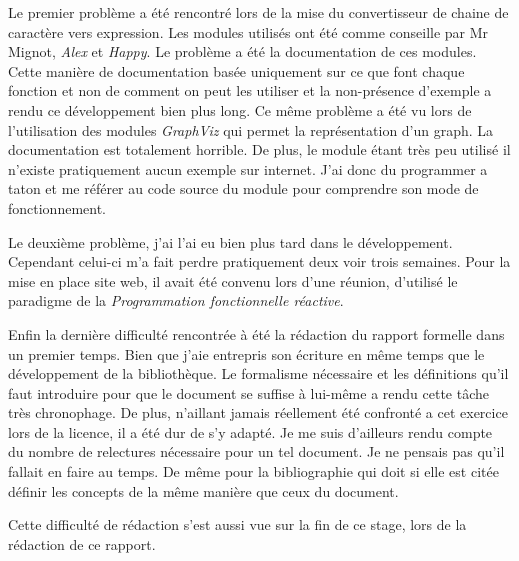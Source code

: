 \vphantom{}

Le premier problème a été rencontré lors de la mise du convertisseur de chaine 
de caractère vers expression. Les modules utilisés ont été comme conseille par 
Mr Mignot, \textit{Alex} et \textit{Happy}. Le problème a été la documentation 
de ces modules. Cette manière de documentation basée uniquement sur ce que font 
chaque fonction et non de comment on peut les utiliser et la non-présence 
d'exemple a rendu ce développement bien plus long. Ce même problème a été vu 
lors de l'utilisation des modules \textit{GraphViz} qui permet la représentation
d'un graph. La documentation est totalement horrible. De plus, le module étant 
très peu utilisé il n'existe pratiquement aucun exemple sur internet. J'ai donc
du programmer a taton et me référer au code source du module pour comprendre 
son mode de fonctionnement.

\vphantom{}

Le deuxième problème, j'ai l'ai eu bien plus tard dans le développement. 
Cependant celui-ci m’a fait perdre pratiquement deux voir trois semaines. Pour 
la mise en place site web, il avait été convenu lors d'une réunion, d'utilisé 
le paradigme de la \textit{Programmation fonctionnelle réactive}. 

\vphantom{}

Enfin la dernière difficulté rencontrée à été la rédaction du rapport formelle 
dans un premier temps. Bien que j'aie entrepris son écriture en même temps que 
le développement de la bibliothèque. Le formalisme nécessaire et les définitions 
qu'il faut introduire pour que le document se suffise à lui-même a rendu cette 
tâche très chronophage. De plus, n'aillant jamais réellement été confronté a 
cet exercice lors de la licence, il a été dur de s'y adapté. Je me suis 
d'ailleurs rendu compte du nombre de relectures nécessaire pour un tel document. 
Je ne pensais pas qu'il fallait en faire au temps. De même pour la bibliographie 
qui doit si elle est citée définir les concepts de la même manière que ceux 
du document.

Cette difficulté de rédaction s'est aussi vue sur la fin de ce stage, lors de la 
rédaction de ce rapport. 


